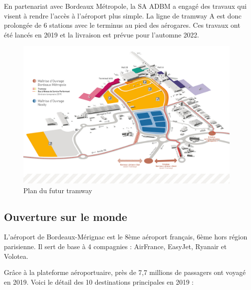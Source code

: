 En partenariat avec Bordeaux Métropole, la SA ADBM a engagé des travaux qui visent à rendre l'accès à l'aéroport plus simple. La ligne de tramway A est donc prolongée de 6 stations avec le terminus au pied des aérogares. Ces travaux ont été lancés en 2019 et la livraison est prévue pour l'automne 2022.\newline

\begin{figure}[hbt!]
    \centering
    \includegraphics[width=16cm]{Images/tramway.jpg}
    \caption{Plan du futur tramway}
    \label{fig:futurtram}
\end{figure}

\newpage

\subsection{Ouverture sur le monde}

L'aéroport de Bordeaux-Mérignac est le 8ème aéroport français, 6ème hors région parisienne. Il sert de base à 4 compagnies : AirFrance, EasyJet, Ryanair et Volotea.\newline

Grâce à la plateforme aéroportuaire, près de 7,7 millions de passagers ont voyagé en 2019. Voici le détail des 10 destinations principales en 2019 :

